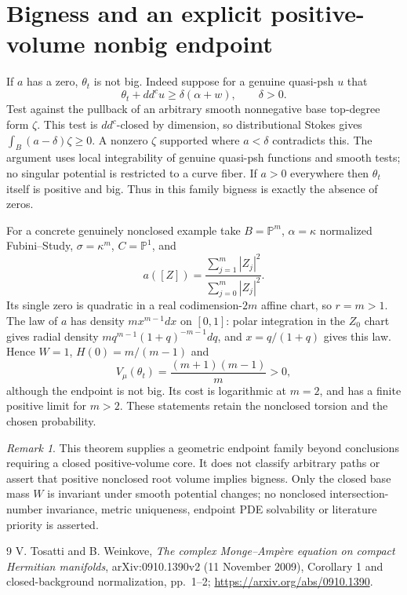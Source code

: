 \documentclass[11pt]{article}
\newcommand{\ddc}{dd^c}
\theoremstyle{remark}\newtheorem{remark}[theorem]{Remark}
\begin{document}
\section{Bigness and an explicit positive-volume nonbig endpoint}
If $a$ has a zero, $\theta_t$ is not big. Indeed suppose for a genuine
quasi-psh $u$ that
\[
 \theta_t+\ddc u\geq\delta(\alpha+w),\qquad\delta>0.
\]
Test against the pullback of an arbitrary smooth nonnegative base
top-degree form $\zeta$. This test is $\ddc$-closed by dimension, so
distributional Stokes gives
$\int_B(a-\delta)\zeta\geq0$.
A nonzero $\zeta$ supported where $a<\delta$ contradicts this.
The argument uses local integrability of genuine quasi-psh functions
and smooth tests; no singular potential is restricted to a curve fiber.
If $a>0$ everywhere then $\theta_t$ itself is positive and big.
Thus in this family bigness is exactly the absence of zeros.

For a concrete genuinely nonclosed example take $B=\mathbb P^m$,
$\alpha=\kappa$ normalized Fubini--Study, $\sigma=\kappa^m$,
$C=\mathbb P^1$, and
\[
 a([Z])=\frac{\sum_{j=1}^m|Z_j|^2}{\sum_{j=0}^m|Z_j|^2}.
\]
Its single zero is quadratic in a real codimension-$2m$ affine chart,
so $r=m>1$. The law of $a$ has density $m x^{m-1}dx$ on $[0,1]$:
polar integration in the $Z_0$ chart gives radial density
$m q^{m-1}(1+q)^{-m-1}dq$, and $x=q/(1+q)$ gives this law.
Hence $W=1$, $H(0)=m/(m-1)$ and
\[
 V_\mu(\theta_t)=\frac{(m+1)(m-1)}m>0,
\]
although the endpoint is not big. Its cost is logarithmic at $m=2$,
and has a finite positive limit for $m>2$.
These statements retain the nonclosed torsion and the chosen probability.

\begin{remark}
This theorem supplies a geometric endpoint family beyond conclusions
requiring a closed positive-volume core. It does not classify arbitrary
paths or assert that positive nonclosed root volume implies bigness.
Only the closed base mass $W$ is invariant under smooth potential
changes; no nonclosed intersection-number invariance, metric uniqueness,
endpoint PDE solvability or literature priority is asserted.
\end{remark}
\begin{thebibliography}{9}
 V. Tosatti and B. Weinkove, \emph{The complex Monge--Amp\`ere
equation on compact Hermitian manifolds}, arXiv:0910.1390v2
(11 November 2009), Corollary 1 and closed-background normalization,
pp.~1--2; \url{https://arxiv.org/abs/0910.1390}.
\end{thebibliography}
\end{document}
